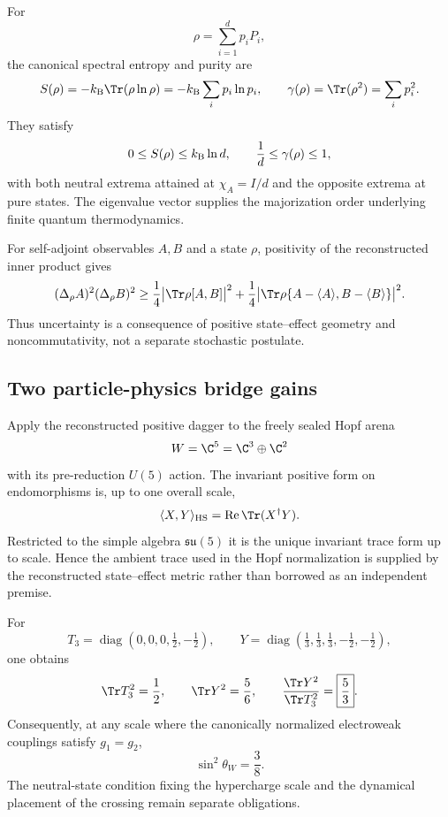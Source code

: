 \begin{corollary}
\label{cor:rd-spectral-entropy}
For
\[
 \rho=\sum_{i=1}^{d}p_iP_i,
\]
the canonical spectral entropy and purity are
\[
 S(\rho)=-k_{\rm B}\Tr(\rho\ln\rho)
        =-k_{\rm B}\sum_i p_i\ln p_i,
 \qquad
 \gamma(\rho)=\Tr(\rho^2)=\sum_i p_i^2.
\]
They satisfy
\[
 0\le S(\rho)\le k_{\rm B}\ln d,
 \qquad
 \frac1d\le\gamma(\rho)\le1,
\]
with both neutral extrema attained at $\chi_A=I/d$ and the opposite extrema at pure
states.  The eigenvalue vector supplies the majorization order underlying finite
quantum thermodynamics.
\end{corollary}

\begin{corollary}
For self-adjoint observables $A,B$ and a state $\rho$, positivity of the reconstructed
inner product gives
\[
 (\Delta_\rho A)^2(\Delta_\rho B)^2
 \ge
 \frac14\bigl|\Tr\rho[A,B]\bigr|^2
 +
 \frac14\bigl|\Tr\rho\{A-\langle A\rangle,
                           B-\langle B\rangle\}\bigr|^2.
\]
Thus uncertainty is a consequence of positive state--effect geometry and
noncommutativity, not a separate stochastic postulate.
\end{corollary}

\subsection{Two particle-physics bridge gains}

\begin{proposition}
\label{prop:rd-canonical-trace-form}
Apply the reconstructed positive dagger to the freely sealed Hopf arena
\[
 W=\C^5=\C^3\oplus\C^2
\]
with its pre-reduction $U(5)$ action.  The invariant positive form on endomorphisms is,
up to one overall scale,
\[
 \langle X,Y\rangle_{\rm HS}
 =
 \operatorname{Re}\Tr(X^\dagger Y).
\]
Restricted to the simple algebra $\mathfrak{su}(5)$ it is the unique invariant trace
form up to scale.  Hence the ambient trace used in the Hopf normalization is supplied
by the reconstructed state--effect metric rather than borrowed as an independent
premise.

For
\[
 T_3=\operatorname{diag}(0,0,0,\tfrac12,-\tfrac12),
 \qquad
 Y=\operatorname{diag}(\tfrac13,\tfrac13,\tfrac13,-\tfrac12,-\tfrac12),
\]
one obtains
\[
 \Tr T_3^2=\frac12,
 \qquad
 \Tr Y^2=\frac56,
 \qquad
 \frac{\Tr Y^2}{\Tr T_3^2}=\boxed{\frac53}.
\]
Consequently, at any scale where the canonically normalized electroweak couplings
satisfy $g_1=g_2$,
\[
 \boxed{\sin^2\theta_W=\frac38.}
\]
The neutral-state condition fixing the hypercharge scale and the dynamical placement
of the crossing remain separate obligations.
\end{proposition}

